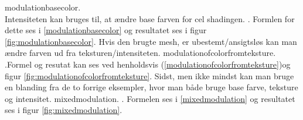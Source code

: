  {modulationbasecolor}. 
\\Intensiteten kan bruges til, at ændre base farven for cel shadingen. . Formlen for dette ses i \ref{modulationbasecolor} og resultatet ses i figur \ref{fig:modulationbasecolor}. 
Hvis den brugte mesh, er ubestemt/ansigtsløs kan man ændre farven ud fra teksturen/intensiteten.  {modulationofcolorfromteksture}. .Formel og resutat kan ses ved henholdsvis (\ref{modulationofcolorfromteksture})og figur \ref{fig:modulationofcolorfromteksture}. Sidst, men ikke mindst kan man bruge en blanding fra de to forrige eksempler, hvor man både bruge base farve, teksture og intensitet. {mixedmodulation}. . Formelen ses i \ref{mixedmodulation} og resultatet ses i figur \ref{fig:mixedmodulation}. 
